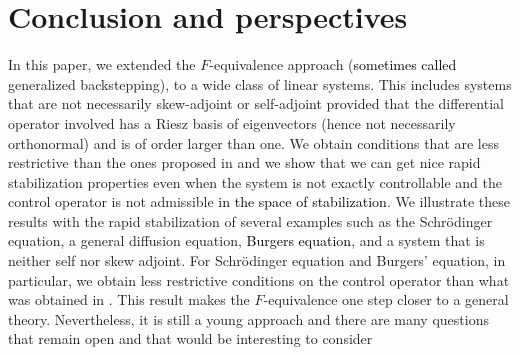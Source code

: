 \documentclass[11pt, dvipsnames]{amsart}
\begin{document}
\section{Conclusion and perspectives}
\label{sec:perspectives}
 In this paper, we extended the $F$-equivalence approach (\textcolor{black}{sometimes called} generalized backstepping), to a wide class of linear systems. This includes systems that are not necessarily skew-adjoint or self-adjoint provided that the differential operator involved has a Riesz basis of eigenvectors (hence not necessarily orthonormal) and is of order larger than one. We obtain conditions that are less restrictive than the ones proposed in \cite{Gagnon2022-fredholm,Gagnon2022-fredholm-laplacien} and we show that we can get nice rapid stabilization properties even when the system is not exactly controllable and the control operator is not admissible \textcolor{black}{in the space of stabilization}. 
We illustrate these results with the rapid stabilization of several examples such as the Schrödinger equation, a general diffusion equation, \textcolor{black}{Burgers equation}, and a system that is neither self nor skew adjoint. For Schrödinger equation and Burgers' equation, in particular, we obtain less restrictive conditions on the control operator than what was obtained in \cite{Coron2018-rapid,nguyen2024rapid,Gagnon2022-fredholm-laplacien}.
This result makes the $F$-equivalence one step closer to a general theory. Nevertheless, it is still a young approach and there are many questions that remain open and that would be interesting to consider
\end{document}
